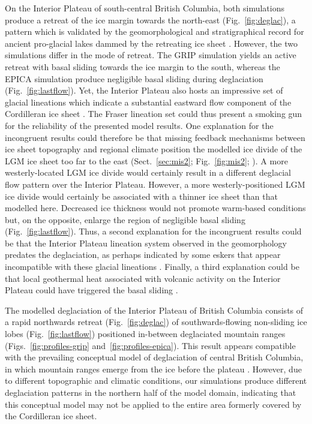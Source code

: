 \documentclass[tc]{copernicus}
\begin{document}
On the Interior Plateau of south-central British Columbia, both simulations
produce a retreat of the ice margin towards the north-east
(Fig.~\ref{fig:deglac}), a pattern which is validated by the geomorphological
and stratigraphical record for ancient pro-glacial lakes dammed by the
retreating ice sheet \citep{Perkins.Brennand.2014}. However, the two
simulations differ in the mode of retreat. The GRIP simulation yields an active
retreat with basal sliding towards the ice margin to the south, whereas the
EPICA simulation produce negligible basal sliding during deglaciation
(Fig.~\ref{fig:lastflow}). Yet, the Interior Plateau also hosts an impressive
set of glacial lineations which indicate a substantial eastward flow component
of the Cordilleran ice sheet \citep{Prest.etal.1968, Kleman.etal.2010}.
The Fraser lineation set could thus present a smoking gun for the
reliability of the presented model results. One explanation for the incongruent
results could therefore be that missing feedback mechanisms between ice sheet
topography and regional climate position the modelled ice divide of the LGM ice
sheet too far to the east (Sect.~\ref{sec:mis2}; Fig.~\ref{fig:mis2};
\citealp{Seguinot.etal.2014}). A more westerly-located LGM ice divide would
certainly result in a different deglacial flow pattern over the Interior
Plateau. However, a more westerly-positioned LGM ice divide would certainly be
associated with a thinner ice sheet than that modelled here. Decreased ice
thickness would not promote warm-based conditions but, on the
opposite, enlarge the region of negligible basal sliding
(Fig.~\ref{fig:lastflow}). Thus, a second explanation for the incongruent
results could be that the Interior Plateau lineation system observed in the
geomorphology predates the deglaciation, as perhaps indicated by some eskers
that appear incompatible with these glacial lineations
\citep[Fig.~9]{Margold.etal.2013a}. Finally, a third explanation could be that
local geothermal heat associated with volcanic activity on the Interior Plateau
could have triggered the basal sliding
\citep[cf. Greenland ice sheet,][]{Fahnestock.etal.2001}.

The modelled deglaciation of the Interior Plateau of British Columbia
consists of a rapid northwards retreat (Fig.~\ref{fig:deglac}) of
southwards-flowing non-sliding ice lobes (Fig.~\ref{fig:lastflow}) positioned
in-between deglaciated mountain ranges
(Figs.~\ref{fig:profiles-grip} and~\ref{fig:profiles-epica}). This result
appears compatible with the prevailing conceptual model of deglaciation of
central British Columbia, in which mountain ranges emerge from the ice before
the plateau \citep[Fig.~7]{Fulton.1991}. However, due to different topographic
and climatic conditions, our simulations produce different deglaciation
patterns in the northern half of the model domain, indicating that this
conceptual model may not be applied to the entire area formerly covered by the
Cordilleran ice sheet.
\end{document}
